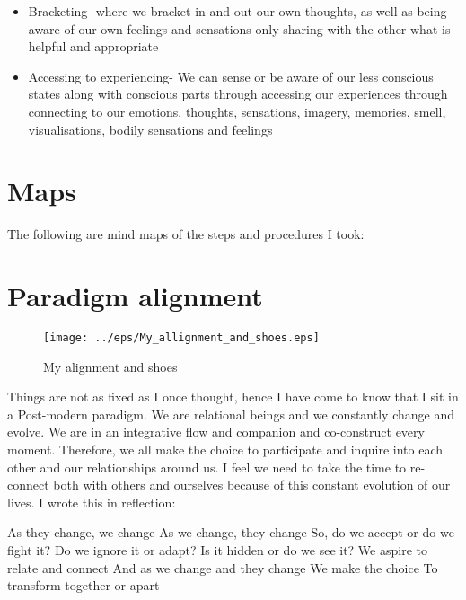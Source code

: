 \begin{itemize}
\item Bracketing- where we bracket in and out our own thoughts, as well as being aware of our own feelings and sensations only sharing with the other what is helpful and appropriate
\end{itemize}

\begin{itemize}
\item Accessing to experiencing- We can sense or be aware of our less conscious states along with conscious parts through accessing our experiences through connecting to our emotions, thoughts, sensations, imagery, memories, smell, visualisations, bodily sensations and feelings
\end{itemize}

\section {Maps}
The following are mind maps of the steps and procedures I took:



\section{Paradigm alignment}

\begin{figure}[htbp]
\begin{center}
\texttt{[image: ../eps/My\_allignment\_and\_shoes.eps]} 
\caption{My alignment and shoes}
\label{label}
\end{center}
\end{figure}
\newpage



Things are not as fixed as I once thought, hence I have come to know that I sit in a Post-modern paradigm. We are relational beings and we constantly change and evolve. We are in an integrative flow and companion and co-construct every moment. Therefore, we all make the choice to participate and inquire into each other and our relationships around us. I feel we need to take the time to re-connect both with others and ourselves because of this constant evolution of our lives. I wrote this in reflection:


\begin {centering}As they change, we change\newline 
As we change, they change\newline 
So, do we accept or do we fight it?\newline 
Do we ignore it or adapt?\newline 
Is it hidden or do we see it?\newline 
We aspire to relate and connect\newline 
And as we change and they change\newline 
We make the choice\newline 
To transform together or apart\newline 
\end {centering} 




